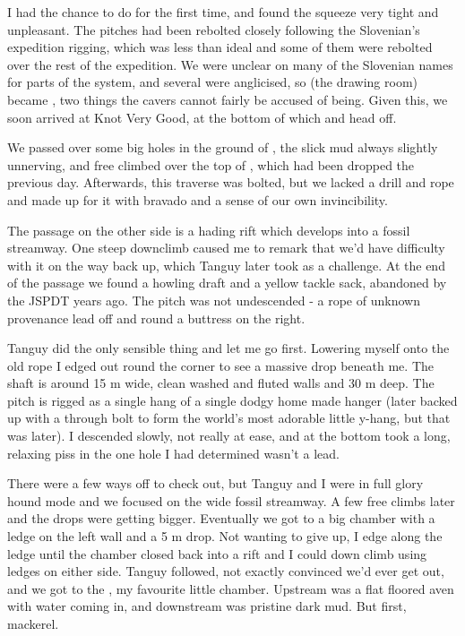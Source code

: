 I had the chance to do  for the first time, and found the squeeze very tight and unpleasant. The pitches had been rebolted closely following the Slovenian’s expedition rigging, which was less than ideal and some of them were rebolted over the rest of the expedition. We were unclear on many of the Slovenian names for parts of the system, and several were anglicised, so  (the drawing room) became , two things the cavers cannot fairly be accused of being. Given this, we soon arrived at Knot Very Good, at the bottom of which  and  head off.
 
We passed over some big holes in the ground of , the slick mud always slightly unnerving, and free climbed over the top of , which had been dropped the previous day. Afterwards, this traverse was bolted, but we lacked a drill and rope and made up for it with bravado and a sense of our own invincibility.
 
The passage on the other side is a hading rift which develops into a fossil streamway. One steep downclimb caused me to remark that we’d have difficulty with it on the way back up, which Tanguy later took as a challenge. At the end of the passage we found a howling draft and a yellow tackle sack, abandoned by the JSPDT years ago. The pitch was not undescended -  a rope of unknown provenance lead off and round a buttress on the right.
 
Tanguy did the only sensible thing and let me go first. Lowering myself onto the old rope I edged out round the corner to see a massive drop beneath me. The shaft is around 15 m wide, clean washed and fluted walls and 30 m deep. The pitch is rigged as a single hang of a single dodgy home made hanger (later backed up with a through bolt to form the world’s most adorable little y-hang, but that was later). I descended slowly, not really at ease, and at the bottom took a long, relaxing piss in the one hole I had determined wasn’t a lead.
 
There were a few ways off to check out, but Tanguy and I were in full glory hound mode and we focused on the wide fossil streamway. A few free climbs later and the drops were getting bigger. Eventually we got to a big chamber with a ledge on the left wall and a 5 m drop. Not wanting to give up, I edge along the ledge until the chamber closed back into a rift and I could down climb using ledges on either side. Tanguy followed, not exactly convinced we’d ever get out, and we got to the , my favourite little chamber. Upstream was a flat floored aven with water coming in, and downstream was pristine dark mud. But first, mackerel.
 
